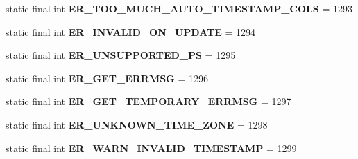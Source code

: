 \begin{DoxyCompactItemize}
\item 
\mbox{\label{classcom_1_1mysql_1_1cj_1_1exceptions_1_1_mysql_error_numbers_a8a8efe796154cf5fb71a6c7058a0b749}} 
static final int {\bfseries E\+R\+\_\+\+T\+O\+O\+\_\+\+M\+U\+C\+H\+\_\+\+A\+U\+T\+O\+\_\+\+T\+I\+M\+E\+S\+T\+A\+M\+P\+\_\+\+C\+O\+LS} = 1293
\item 
\mbox{\label{classcom_1_1mysql_1_1cj_1_1exceptions_1_1_mysql_error_numbers_a827253e7c3ccc8210203bd21142b44b5}} 
static final int {\bfseries E\+R\+\_\+\+I\+N\+V\+A\+L\+I\+D\+\_\+\+O\+N\+\_\+\+U\+P\+D\+A\+TE} = 1294
\item 
\mbox{\label{classcom_1_1mysql_1_1cj_1_1exceptions_1_1_mysql_error_numbers_aec13e9c06e11b350641a833770ba1aa2}} 
static final int {\bfseries E\+R\+\_\+\+U\+N\+S\+U\+P\+P\+O\+R\+T\+E\+D\+\_\+\+PS} = 1295
\item 
\mbox{\label{classcom_1_1mysql_1_1cj_1_1exceptions_1_1_mysql_error_numbers_adfc55e1776138d46dd5680e4ab4debba}} 
static final int {\bfseries E\+R\+\_\+\+G\+E\+T\+\_\+\+E\+R\+R\+M\+SG} = 1296
\item 
\mbox{\label{classcom_1_1mysql_1_1cj_1_1exceptions_1_1_mysql_error_numbers_a37d4cca42a7cee7432691dcdec80cc48}} 
static final int {\bfseries E\+R\+\_\+\+G\+E\+T\+\_\+\+T\+E\+M\+P\+O\+R\+A\+R\+Y\+\_\+\+E\+R\+R\+M\+SG} = 1297
\item 
\mbox{\label{classcom_1_1mysql_1_1cj_1_1exceptions_1_1_mysql_error_numbers_a05619d166ce664637ea1ea601cf72a6f}} 
static final int {\bfseries E\+R\+\_\+\+U\+N\+K\+N\+O\+W\+N\+\_\+\+T\+I\+M\+E\+\_\+\+Z\+O\+NE} = 1298
\item 
\mbox{\label{classcom_1_1mysql_1_1cj_1_1exceptions_1_1_mysql_error_numbers_a9b9f43137908972d844562b008413bbe}} 
static final int {\bfseries E\+R\+\_\+\+W\+A\+R\+N\+\_\+\+I\+N\+V\+A\+L\+I\+D\+\_\+\+T\+I\+M\+E\+S\+T\+A\+MP} = 1299

\end{DoxyCompactItemize}
